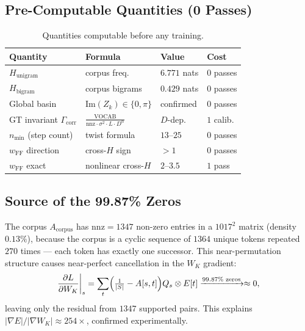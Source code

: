 \documentclass[11pt]{amsart}
\begin{document}
\subsection{Pre-Computable Quantities (0 Passes)}

\begin{table}[htbp]
\centering\small
\caption{Quantities computable before any training.}
\label{tab:precompute}
\begin{tabular}{llll}
\toprule
\textbf{Quantity} & \textbf{Formula} & \textbf{Value} & \textbf{Cost} \\
\midrule
$H_\mathrm{unigram}$        & corpus freq.\ & $6.771$ nats & $0$ passes \\
$H_\mathrm{bigram}$         & corpus bigrams & $0.429$ nats & $0$ passes \\
Global basin                 & $\mathrm{Im}(Z_k)\in\{0,\pi\}$ & confirmed & $0$ passes \\
GT invariant $\Gamma_\mathrm{corr}$ & $\frac{\mathrm{VOCAB}}{\mathrm{nnz}\cdot\sigma^2\cdot L\cdot D^\alpha}$ & $D$-dep. & $1$ calib. \\
$n_\mathrm{min}$ (step count) & twist formula & $13$--$25$ & $0$ passes \\
$w_\mathrm{FF}$ direction    & cross-$H$ sign & $>1$        & $0$ passes \\
$w_\mathrm{FF}$ exact        & nonlinear cross-$H$ & $2$--$3.5$ & $1$ pass \\
\bottomrule
\end{tabular}
\end{table}

\subsection{Source of the 99.87\% Zeros}

The corpus $A_\mathrm{corpus}$ has $\mathrm{nnz}=1347$ non-zero entries
in a $1017^2$ matrix (density $0.13\%$), because the corpus is a
cyclic sequence of $1364$ unique tokens repeated $270$ times
--- each token has exactly one successor.
This near-permutation structure causes near-perfect cancellation in
the $W_K$ gradient:
\[
  \frac{\partial L}{\partial W_K}\bigg|_s
  = \sum_t \Bigl(\tfrac{1}{|S|} - A[s,t]\Bigr) Q_s \otimes E[t]
  \xrightarrow{99.87\%\text{ zeros}} \approx 0,
\]
leaving only the residual from $1347$ supported pairs.
This explains $|\nabla E|/|\nabla W_K| \approx 254\times$,
confirmed experimentally.

\end{document}
